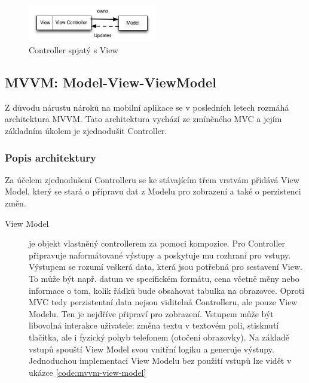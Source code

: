 \begin{figure}\centering
	\includegraphics[width=0.5\textwidth]{assets/mvc-massive-view-controller.png}
	\caption[Role Controlleru v MVC]{Controller spjatý s View}\label{fig:massive-mvc}
\end{figure}

\subsection{MVVM: Model-View-ViewModel}\label{analyza-mvvm}

Z důvodu nárustu nároků na mobilní aplikace se v posledních letech rozmáhá architektura MVVM.
Tato architektura vychází ze zmíněného MVC a jejím základním úkolem je zjednodušit Controller.

\subsubsection{Popis architektury} \label{architektura-mvvm-popis}

Za účelem zjednodušení Controlleru se ke stávajícím třem vrstvám přidává View Model, který se stará o přípravu dat z Modelu pro zobrazení a také o perzistenci změn.

\begin{description}
  \item[View Model] je objekt vlastněný controllerem za pomoci kompozice.
  Pro Controller připravuje naformátované výstupy a poskytuje mu rozhraní pro vstupy.
  Výstupem se rozumí veškerá data, která jsou potřebná pro sestavení View.
  To může být např. datum ve specifickém formátu, cena včetně měny nebo informace o tom, kolik řádků bude obsahovat tabulka na obrazovce.
  Oproti MVC tedy perzistentní data nejsou viditelná Controlleru, ale pouze View Modelu.
  Ten je nejdříve připraví pro zobrazení.
  Vstupem může být libovolná interakce uživatele:
  změna textu v textovém poli, stisknutí tlačítka, ale i fyzický pohyb telefonem (otočení obrazovky).
  Na základě vstupů spouští View Model svou vnitřní logiku a generuje výstupy.
  Jednoduchou implementaci View Modelu bez použití vstupů lze vidět v ukázce \ref{code:mvvm-view-model}
\end{description}


